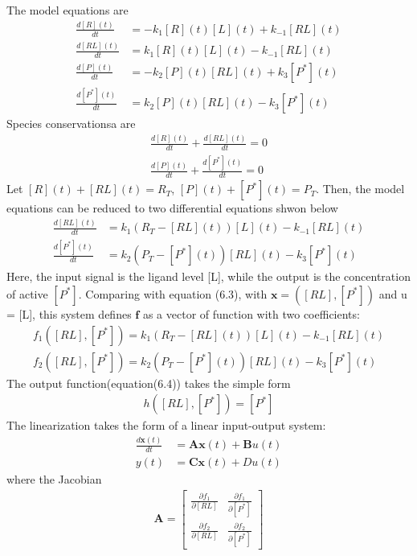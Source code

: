 \documentclass[paper=a4, fontsize=11pt]{scrartcl} %
\numberwithin{equation}{section} %
\numberwithin{figure}{section} %
\numberwithin{table}{section} %
\begin{document}
\begin{enumerate}[a)]
		The model equations are
		\begin{align*}
			\frac{d[R](t)}{dt}  &= -k_1[R](t)[L](t) + k_{-1}[RL](t)\\
			\frac{d[RL](t)}{dt} &= k_1[R](t)[L](t) - k_{-1}[RL](t)\\
			\frac{d[P](t)}{dt}  &= -k_2[P](t)[RL](t) + k_3[P^*](t)\\
			\frac{d[P^*](t)}{dt}&= k_2[P](t)[RL](t) - k_3[P^*](t)
		\end{align*}
		Species conservationsa are
		\begin{align*}
			\frac{d[R](t)}{dt}  + \frac{d[RL](t)}{dt} = 0\\
			\frac{d[P](t)}{dt}  + \frac{d[P^*](t)}{dt} = 0
		\end{align*}
		Let $[R](t)+[RL](t)=R_T$, $[P](t)+[P^*](t)=P_T$. Then, the model equations can be reduced to two differential equations shwon below
		\begin{align*}
			\frac{d[RL](t)}{dt} &= k_1(R_T-[RL](t))[L](t) - k_{-1}[RL](t)\\
			\frac{d[P^*](t)}{dt}&= k_2(P_T-[P^*](t))[RL](t) - k_3[P^*](t)
		\end{align*}
		Here, the input signal is the ligand level [L], while the output is the concentration of active $[P^*]$. Comparing with equation (6.3), with $\mathbf{x} = ([RL],[P^*])$ and u = [L], this system defines $\mathbf{f}$ as a vector of function with two coefficients:
		\begin{align*}
			f_1([RL],[P^*])= k_1(R_T-[RL](t))[L](t) - k_{-1}[RL](t)\\
			f_2([RL],[P^*])= k_2(P_T-[P^*](t))[RL](t) - k_3[P^*](t)
		\end{align*}
		The output function(equation(6.4)) takes the simple form
		\begin{align*}
			h([RL],[P^*])=[P^*]
		\end{align*}
		The linearization takes the form of a linear input-output system:
		\begin{align*}
			\frac{d\mathbf{x}(t)}{dt} &= \mathbf{Ax}(t)+\mathbf{B}u(t)\\
			y(t) &= \mathbf{Cx}(t) + Du(t) 
		\end{align*}
		where the Jacobian
		\begin{align*}
			\mathbf{A}=
			\begin{bmatrix}
					\frac{\partial f_1}{\partial [RL]}&\frac{\partial f_1}{\partial [P^*]}\\
					\frac{\partial f_2}{\partial [RL]}&\frac{\partial f_2}{\partial [P^*]}
			\end{bmatrix}

\end{align*}
\end{enumerate}
\end{document}
